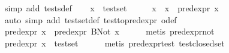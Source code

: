 \begin{isabellebody}
%
\isadelimproof
%
\endisadelimproof
%
\isatagproof
{}\isamarkupfalse%
\ {}simp\ add{}\ tests{}def{}\isanewline
\ \ \isamarkupfalse%
\ {}x\ {}\ test{}set{}\isanewline
\ \ \isamarkupfalse%
\ \isamarkupfalse%
\ x{}\ \ {}x\ {}\ pred{}expr\ x{}{}\isanewline
\ \ \ \ \isamarkupfalse%
\ {}auto\ simp\ add{}\ test{}set{}def\ test{}to{}pred{}expr\ o{}def{}\isanewline
\ \ \isamarkupfalse%
\ {}{}{}pred{}expr\ x{}{}\ {}\ pred{}expr\ {}BNot\ x{}{}{}\isanewline
\ \ \ \ \isamarkupfalse%
\ {}metis\ pred{}expr{}not{}\isanewline
\ \ \isamarkupfalse%
\ {}{}{}pred{}expr\ x{}{}\ {}\ test{}set{}\isanewline
\ \ \ \ \isamarkupfalse%
\ {}metis\ pred{}expr{}test\ test{}closed{}set{}\isanewline

\end{isabellebody}
